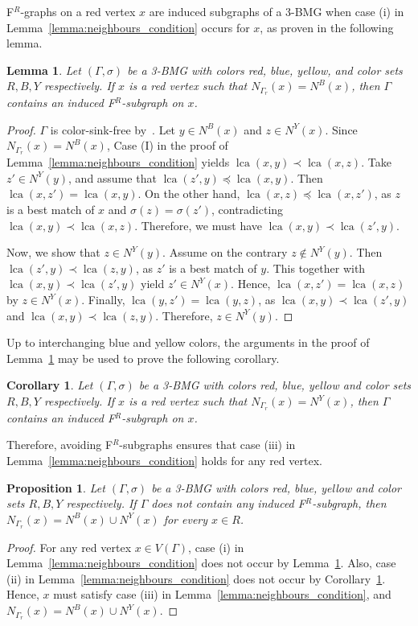 \documentclass[final,3p,times]{elsarticle}
\newtheorem{proposition}[theorem]{Proposition}%
\newtheorem{lemma}[theorem]{Lemma}%
\newtheorem{corollary}[theorem]{Corollary}%
\DeclareMathOperator{\lca}{lca}
\begin{document}
F$^R$-graphs on a red vertex $x$ are induced subgraphs of a 3-BMG when case (i) in Lemma~\ref{lemma:neighbours_condition} occurs for $x$, as proven in the following lemma.
\begin{lemma}
\label{lemma:caseI-red_triangular}
Let $(\Gamma,\sigma)$ be a 3-BMG with colors red, blue, yellow, and color sets $R,B,Y$ respectively.  If $x$ is a red vertex such that $N_{\Gamma_r}(x)=N^B(x)$, then $\Gamma$ contains an induced F$^R$-subgraph on $x$.
\end{lemma}
\begin{proof}
$\Gamma$ is color-sink-free by~\cite[Proposition~2.3]{korchmaros2021quasi}. Let $y\in N^B(x)$ and $z\in N^Y(x)$. Since $N_{\Gamma_r}(x)=N^B(x)$, Case (I) in the proof of Lemma~\ref{lemma:neighbours_condition} yields $\lca(x,y)\prec \lca(x,z)$. Take $z'\in N^Y(y)$, and assume that $\lca(z',y)\preceq \lca(x,y)$. Then $\lca(x,z')=\lca(x,y)$. On the other hand, $\lca(x,z)\preceq \lca(x,z')$, as $z$ is a best match of $x$ and $\sigma(z)=\sigma(z')$, contradicting $\lca(x,y) \prec \lca(x,z)$. Therefore, we must have $\lca(x,y)\prec \lca(z',y)$.

Now, we show that $z\in N^Y(y)$. Assume on the contrary $z\notin N^Y(y)$. Then $\lca(z',y)\prec \lca(z,y)$, as $z'$ is a best match of $y$. This together with $\lca(x,y)\prec \lca(z',y)$ yield $z'\in N^Y(x)$. Hence, $\lca(x,z')=\lca(x,z)$ by $z\in N^Y(x)$. Finally, $\lca(y,z')=\lca(y,z)$, as $\lca(x,y)\prec \lca(z',y)$ and $\lca(x,y)\prec \lca(z,y)$. Therefore, $z\in N^Y(y)$.
\end{proof}

Up to interchanging blue and yellow colors, the arguments in the proof of Lemma~\ref{lemma:caseI-red_triangular} may be used to prove the following corollary.

\begin{corollary}
\label{cor:caseII-red_triangular}
Let $(\Gamma,\sigma)$ be a 3-BMG with colors red, blue, yellow and color sets $R,B,Y$ respectively. If $x$ is a red vertex such that $N_{\Gamma_r}(x)=N^Y(x)$, then $\Gamma$ contains an induced F$^R$-subgraph on $x$.
\end{corollary}

Therefore, avoiding F$^R$-subgraphs ensures that case (iii) in Lemma~\ref{lemma:neighbours_condition} holds for any red vertex.

\begin{proposition}
\label{prop:caseiii-suf_cond}
Let $(\Gamma,\sigma)$ be a 3-BMG with colors red, blue, yellow  and color sets $R,B,Y$ respectively. If $\Gamma$ does not contain any induced F$^R$-subgraph, then $N_{\Gamma_r}(x)=N^B(x)\cup N^Y(x)$ for every $x\in R$.
\end{proposition}
\begin{proof}
For any red vertex $x\in V(\Gamma)$, case (i) in Lemma~\ref{lemma:neighbours_condition} does not occur by Lemma~\ref{lemma:caseI-red_triangular}. Also, case (ii) in Lemma~\ref{lemma:neighbours_condition} does not occur by Corollary~\ref{cor:caseII-red_triangular}. Hence, $x$ must satisfy case (iii) in Lemma~\ref{lemma:neighbours_condition}, and $N_{\Gamma_r}(x)=N^B(x)\cup N^Y(x)$. 
\end{proof}
\end{document}
